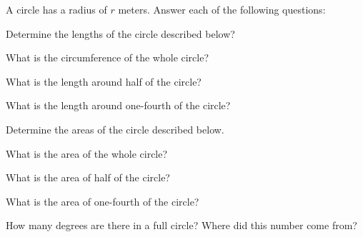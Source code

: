 
\begin{problem}
\item A circle has a radius of $r$ meters. Answer each of the
  following questions:
  \begin{subproblem}
  \item Determine the lengths of the circle described below?
    \begin{subproblem}
    \item What is the circumference of the whole circle?
      \vfill
    \item What is the length around half of the circle?
      \vfill
    \item What is the length around one-fourth of the circle?
      \vfill
    \end{subproblem}
  \item Determine the areas of the circle described below.
    \begin{subproblem}
    \item What is the area of the whole circle?
      \vfill
    \item What is the area of half of the circle?
      \vfill
    \item What is the area of one-fourth of the circle?
      \vfill
    \end{subproblem}
  \item How many degrees are there in a full circle? Where did this
    number come from?
    \vfill
  \end{subproblem}
\end{problem}


